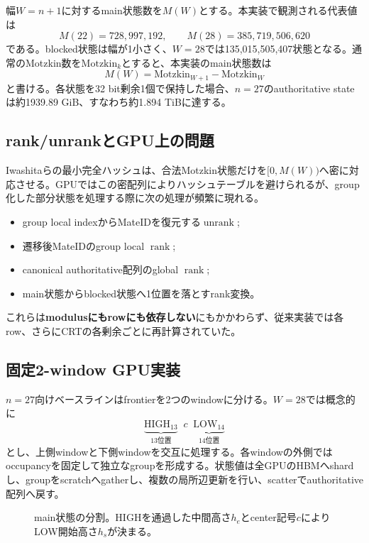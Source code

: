 \documentclass[a4paper,10pt,twocolumn]{ltjsarticle}
\newcommand{\high}{\mathrm{HIGH}}
\newcommand{\low}{\mathrm{LOW}}
\newcommand{\rank}{\operatorname{rank}}
\newcommand{\unrank}{\operatorname{unrank}}
\begin{document}
幅$W=n+1$に対するmain状態数を$M(W)$とする。本実装で観測される代表値は
\[
M(22)=728{,}997{,}192,\qquad
M(28)=385{,}719{,}506{,}620
\]
である。blocked状態は幅が1小さく、$W=28$では135,015,505,407状態となる。通常のMotzkin数を$\mathrm{Motzkin}_k$とすると、本実装のmain状態数は
\[
M(W)=\mathrm{Motzkin}_{W+1}-\mathrm{Motzkin}_{W}
\]
と書ける。各状態を32 bit剰余1個で保持した場合、$n=27$のauthoritative stateは約1939.89 GiB、すなわち約1.894 TiBに達する。

\subsection{rank/unrankとGPU上の問題}
Iwashitaらの最小完全ハッシュは、合法Motzkin状態だけを$[0,M(W))$へ密に対応させる\cite{iwashita2013}。GPUではこの密配列によりハッシュテーブルを避けられるが、group化した部分状態を処理する際に次の処理が頻繁に現れる。
\begin{itemize}
  \item group local indexからMateIDを復元する$\unrank$;
  \item 遷移後MateIDのgroup local $\rank$;
  \item canonical authoritative配列のglobal $\rank$;
  \item main状態からblocked状態へ1位置を落とすrank変換。
\end{itemize}
これらは\textbf{modulusにもrowにも依存しない}にもかかわらず、従来実装では各row、さらにCRTの各剰余ごとに再計算されていた。

\subsection{固定2-window GPU実装}
$n=27$向けベースラインはfrontierを2つのwindowに分ける。$W=28$では概念的に
\[
\underbrace{\high_{13}}_{13\text{位置}}\;\;c\;\;
\underbrace{\low_{14}}_{14\text{位置}}
\]
とし、上側windowと下側windowを交互に処理する。各windowの外側ではoccupancyを固定して独立なgroupを形成する。状態値は全GPUのHBMへshardし、groupをscratchへgatherし、複数の局所辺更新を行い、scatterでauthoritative配列へ戻す。

\begin{figure}[t]
\centering
{}
\caption{main状態の分割。HIGHを通過した中間高さ$h_e$とcenter記号$c$によりLOW開始高さ$h_s$が決まる。}
\label{fig:split}
\end{figure}
\end{document}
